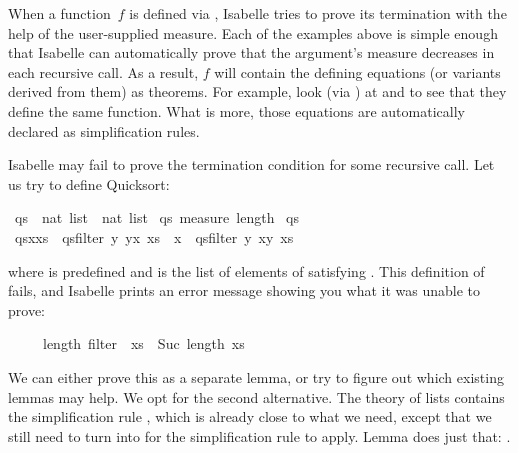 %
\begin{isabellebody}%
\def\isabellecontext{termination}%
\isamarkupfalse%
%
\begin{isamarkuptext}%
When a function~$f$ is defined via , Isabelle tries to prove
its termination with the help of the user-supplied measure.  Each of the examples
above is simple enough that Isabelle can automatically prove that the
argument's measure decreases in each recursive call. As a result,
$f$ will contain the defining equations (or variants derived
from them) as theorems. For example, look (via ) at
 and  to see that they define
the same function. What is more, those equations are automatically declared as
simplification rules.

Isabelle may fail to prove the termination condition for some
recursive call.  Let us try to define Quicksort:%
\end{isamarkuptext}%
\isamarkuptrue%
\ qs\ {\isacharcolon}{\isacharcolon}\ {\isachardoublequote}nat\ list\ {\isasymRightarrow}\ nat\ list{\isachardoublequote}\isanewline
\isamarkupfalse%
\ qs\ {\isachardoublequote}measure\ length{\isachardoublequote}\isanewline
\ {\isachardoublequote}qs\ {\isacharbrackleft}{\isacharbrackright}\ {\isacharequal}\ {\isacharbrackleft}{\isacharbrackright}{\isachardoublequote}\isanewline
\ {\isachardoublequote}qs{\isacharparenleft}x{\isacharhash}xs{\isacharparenright}\ {\isacharequal}\ qs{\isacharparenleft}filter\ {\isacharparenleft}{\isasymlambda}y{\isachardot}\ y{\isasymle}x{\isacharparenright}\ xs{\isacharparenright}\ {\isacharat}\ {\isacharbrackleft}x{\isacharbrackright}\ {\isacharat}\ qs{\isacharparenleft}filter\ {\isacharparenleft}{\isasymlambda}y{\isachardot}\ x{\isacharless}y{\isacharparenright}\ xs{\isacharparenright}{\isachardoublequote}\isamarkupfalse%
%
\begin{isamarkuptext}%
\noindent where  is predefined and 
is the list of elements of  satisfying .
This definition of  fails, and Isabelle prints an error message
showing you what it was unable to prove:
\begin{isabelle}%
\ \ \ \ \ length\ {\isacharparenleft}filter\ {\isachardot}{\isachardot}{\isachardot}\ xs{\isacharparenright}\ {\isacharless}\ Suc\ {\isacharparenleft}length\ xs{\isacharparenright}%
\end{isabelle}
We can either prove this as a separate lemma, or try to figure out which
existing lemmas may help. We opt for the second alternative. The theory of
lists contains the simplification rule ,
which is already
close to what we need, except that we still need to turn \mbox{}
into
\isa{{\isasymle}} for the simplification rule to apply. Lemma
 does just that: .


\end{isamarkuptext}
\end{isabellebody}
